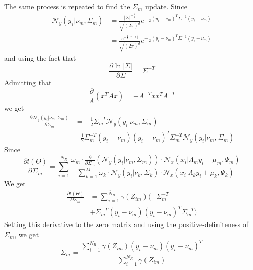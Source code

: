 The same process is repeated to find the $\Sigma_m$ update. Since
\begin{align}
\mathcal{N}_y\left(y_i\vert\nu_m,\Sigma_m\right) &= \frac{\vert\Sigma\vert^{-\frac{1}{2}}}{\sqrt{\left(2\pi\right)^d}}e^{-\frac{1}{2}\left(y_i - \nu_m\right)^T\Sigma^{-1}\left(y_i - \nu_m\right)}\\
&= \frac{e^{-\frac{1}{2}\ln\vert\Sigma\vert}}{\sqrt{\left(2\pi\right)^d}}e^{-\frac{1}{2}\left(y_i - \nu_m\right)^T\Sigma^{-1}\left(y_i - \nu_m\right)}
\end{align}
and using the fact that
\begin{equation}
\frac{\partial \ln\vert\Sigma\vert}{\partial \Sigma} = \Sigma^{-T}
\end{equation}
Admitting that
\begin{equation}
\frac{\partial }{A}\left(x^TAx\right) = - A^{-T}xx^TA^{-T}
\end{equation}
we get
\begin{align}
\frac{\partial\mathcal{N}_y\left(y_i\vert\nu_m,\Sigma_m\right)}{\partial \Sigma_m} &= -\frac{1}{2}\Sigma_m^{-T}\mathcal{N}_y\left(y_i\vert\nu_m,\Sigma_m\right) \nonumber\\
&+ \frac{1}{2}
\Sigma_m^{-T}\left(y_i - \nu_m\right)\left(y_i - \nu_m\right)^T\Sigma_m^{-T}\mathcal{N}_y\left(y_i\vert\nu_m,\Sigma_m\right) 
\end{align}
Since
\begin{equation}
\frac{\partial l(\Theta)}{\partial \Sigma_m} =   \sum\limits_{i = 1}^{\bar{N}_R}
\frac{\omega_m\cdot
\frac{\partial }{\partial \Sigma_m}\left(\mathcal{N}_y\left(y_i\vert\nu_m,\Sigma_m\right)\right)\cdot\mathcal{N}_x\left(x_i\vert\Lambda_my_i + \mu_m,\Psi_m\right)}{\sum\limits_{k = 1}^{M}\omega_k\cdot
\mathcal{N}_y\left(y_i\vert\nu_k,\Sigma_k\right)\cdot\mathcal{N}_x\left(x_i\vert\Lambda_ky_i + \mu_k,\Psi_k\right) }
\end{equation}
We get
\begin{align}
\frac{\partial l(\Theta)}{\partial \Sigma_m} &=   \sum\limits_{i = 1}^{\bar{N}_R}\gamma\left(Z_{im}\right)(-\Sigma_m^{-T}\nonumber\\
&+ 
\Sigma_m^{-T}\left(y_i - \nu_m\right)\left(y_i - \nu_m\right)^T\Sigma_m^{-T} )
\end{align}
Setting this derivative to the zero matrix and using the positive-definiteness of $\Sigma_m$, we get
\begin{equation}
\boxed{
\Sigma_m = \frac{  \sum\limits_{i = 1}^{\bar{N}_R} \gamma(Z_{im})\left(y_i - \nu_m\right)\left(y_i - \nu_m\right)^T }{  \sum\limits_{i = 1}^{\bar{N}_R}\gamma(Z_{im})}}
\end{equation}
